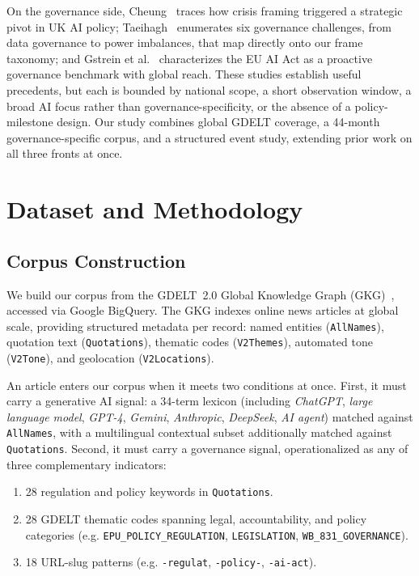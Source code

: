 \documentclass[sigconf]{acmart}
\begin{document}
On the governance side, Cheung~\cite{cheung_generative_2025} traces how crisis framing triggered a strategic pivot in UK AI policy; Taeihagh~\cite{taeihagh_governance_2025} enumerates six governance challenges, from data governance to power imbalances, that map directly onto our frame taxonomy; and Gstrein et al.~\cite{gstrein_general-purpose_2024} characterizes the EU AI Act as a proactive governance benchmark with global reach.
These studies establish useful precedents, but each is bounded by national scope, a short observation window, a broad AI focus rather than governance-specificity, or the absence of a policy-milestone design.
Our study combines global GDELT coverage, a 44-month governance-specific corpus, and a structured event study, extending prior work on all three fronts at once.

\section{Dataset and Methodology}

\subsection{Corpus Construction}

We build our corpus from the GDELT~2.0 Global Knowledge Graph (GKG)~\cite{kalev_gdelt_2013}, accessed via Google BigQuery.
The GKG indexes online news articles at global scale, providing structured metadata per record: named entities (\texttt{AllNames}), quotation text (\texttt{Quotations}), thematic codes (\texttt{V2Themes}), automated tone (\texttt{V2Tone}), and geolocation (\texttt{V2Locations}).

An article enters our corpus when it meets two conditions at once.
First, it must carry a generative AI signal: a 34-term lexicon (including \textit{ChatGPT}, \textit{large language model}, \textit{GPT-4}, \textit{Gemini}, \textit{Anthropic}, \textit{DeepSeek}, \textit{AI agent}) matched against \texttt{AllNames}, with a multilingual contextual subset additionally matched against \texttt{Quotations}.
Second, it must carry a governance signal, operationalized as any of three complementary indicators:
\begin{enumerate}
    \item 28 regulation and policy keywords in \texttt{Quotations}.
    \item 28 GDELT thematic codes spanning legal, accountability, and policy categories (e.g. \texttt{EPU\_POLICY\_REGULATION}, \texttt{LEGISLATION}, \texttt{WB\_831\_GOVERNANCE}).
    \item 18 URL-slug patterns (e.g. \texttt{-regulat}, \texttt{-policy-}, \texttt{-ai-act}).
\end{enumerate}
\end{document}
